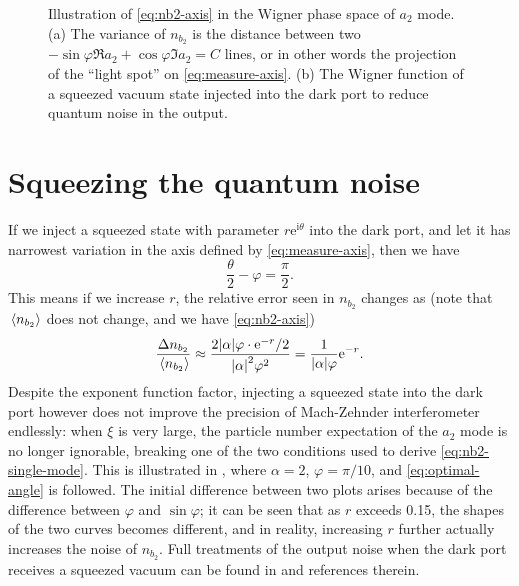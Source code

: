 \documentclass[hyperref, a4paper]{article}
\newcommand*{\ii}{\mathrm{i}}
\newcommand*{\ee}{\mathrm{e}}
\begin{document}
\begin{figure}
    \centering
    \begin{subfigure}{0.48\textwidth}
        \centering
        
        \subcaption{}
    \end{subfigure}
    \begin{subfigure}{0.48\textwidth}
        \centering
        
        \subcaption{}
    \end{subfigure}
    \caption{Illustration of \eqref{eq:nb2-axis} in the Wigner phase space of $a_2$ mode. 
    (a) The variance of $n_{b_2}$ is the distance 
    between two $-\sin \varphi \Re a_2 + \cos \varphi \Im a_2 = C$ lines,
    or in other words the projection of the ``light spot'' on \eqref{eq:measure-axis}.
    (b) The Wigner function of a squeezed vacuum state injected into the dark port 
    to reduce quantum noise in the output.
    }
    \label{fig:can-be-squeezed}
\end{figure}

\section{Squeezing the quantum noise}\label{sec:squeezing}

If we inject a squeezed state with parameter $r \ee^{\ii \theta}$ 
into the dark port,
and let it has narrowest variation in the axis defined by \eqref{eq:measure-axis}, 
then we have 
\begin{equation}
    \frac{\theta}{2} - \varphi = \frac{\pi}{2}.
    \label{eq:optimal-angle}
\end{equation}
This means if we increase $r$, 
the relative error seen in $n_{b_2}$ changes as 
(note that $\expval*{n_{b_2}}$ does not change,
and we have \eqref{eq:nb2-axis})
\begin{equation}
    \frac{\Delta n_{b_2}}{\expval*{n_{b_2}}} 
    \approx \frac{2 \abs{\alpha} \varphi \cdot \ee^{-r} /2 }{\abs{\alpha}^2 \varphi^2} 
    = \frac{1}{\abs{\alpha} \varphi} \ee^{-r}.
    \label{eq:approx-squeezing}
\end{equation}
Despite the exponent function factor,
injecting a squeezed state into the dark port however does not improve 
the precision of Mach-Zehnder interferometer endlessly:
when $\xi$ is very large,
the particle number expectation of the $a_2$ mode is no longer ignorable,
breaking one of the two conditions used to derive \eqref{eq:nb2-single-mode}.
This is illustrated in ,
where $\alpha = 2$, $\varphi = \pi / 10$,
and \eqref{eq:optimal-angle} is followed.
The initial difference between two plots arises because of the difference between $\varphi$ and $\sin \varphi$;
it can be seen that as $r$ exceeds 0.15,
the shapes of the two curves becomes different,
and in reality, increasing $r$ further actually increases the noise of $n_{b_2}$.
Full treatments of the output noise when the dark port receives a squeezed vacuum
can be found in \cite{walls_quantum_2008,pezze_mach-zehnder_2008} and references therein.
\end{document}
